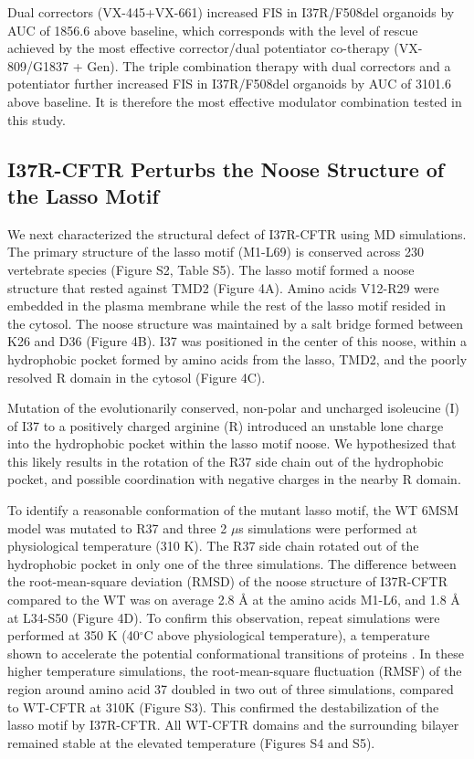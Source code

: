 Dual correctors (VX-445+VX-661) increased FIS in I37R/F508del organoids by AUC of 1856.6 above baseline, which corresponds with the level of rescue achieved by the most effective corrector/dual potentiator co-therapy (VX-809/G1837 + Gen). The triple combination therapy with dual correctors and a potentiator further increased FIS in I37R/F508del organoids by AUC of 3101.6 above baseline. It is therefore the most effective modulator combination tested in this study.

\subsection{I37R-CFTR Perturbs the Noose Structure of the Lasso Motif}

We next characterized the structural defect of I37R-CFTR using MD simulations. The primary structure of the lasso motif (M1-L69) is conserved across 230 vertebrate species (Figure S2, Table S5). The lasso motif formed a noose structure that rested against TMD2 (Figure 4A). Amino acids V12-R29 were embedded in the plasma membrane while the rest of the lasso motif resided in the cytosol. The noose structure was maintained by a salt bridge formed between K26 and D36 (Figure 4B). I37 was positioned in the center of this noose, within a hydrophobic pocket formed by amino acids from the lasso, TMD2, and the poorly resolved R domain in the cytosol (Figure 4C).

Mutation of the evolutionarily conserved, non-polar and uncharged isoleucine (I) of I37 to a positively charged arginine (R) introduced an unstable lone charge into the hydrophobic pocket within the lasso motif noose. We hypothesized that this likely results in the rotation of the R37 side chain out of the hydrophobic pocket, and possible coordination with negative charges in the nearby R domain.

To identify a reasonable conformation of the mutant lasso motif, the WT 6MSM model was mutated to R37 and three 2 $\mu$s simulations were performed at physiological temperature (310 K). The R37 side chain rotated out of the hydrophobic pocket in only one of the three simulations. The difference between the root-mean-square deviation (RMSD) of the noose structure of I37R-CFTR compared to the WT was on average 2.8 $\mbox{\AA}$ at the amino acids M1-L6, and 1.8 $\mbox{\AA}$ at L34-S50 (Figure 4D). To confirm this observation, repeat simulations were performed at 350 K (40$^\circ$C above physiological temperature), a temperature shown to accelerate the potential conformational transitions of proteins \cite{beckerman2015}. In these higher temperature simulations, the root-mean-square fluctuation (RMSF) of the region around amino acid 37 doubled in two out of three simulations, compared to WT-CFTR at 310K (Figure S3). This confirmed the destabilization of the lasso motif by I37R-CFTR. All WT-CFTR domains and the surrounding bilayer remained stable at the elevated temperature (Figures S4 and S5).

